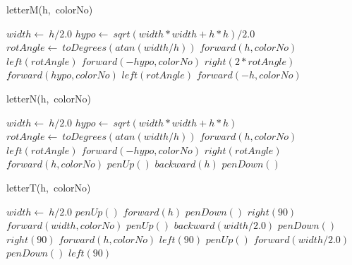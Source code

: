 \documentclass[a4paper,10pt]{article}
\begin{document}
\begin{algorithm}
\caption{letterM(h,\ colorNo)}
\begin{algorithmic}[5]

\STATE {}
\STATE {}
  \STATE \(width\gets\ h/2.0\)
  \STATE \(hypo\gets\ sqrt(width*width+h*h)/2.0\)
  \STATE \(rotAngle\gets\ toDegrees(atan(width/h))\)
  \STATE \(forward(h,colorNo)\)
  \STATE \(left(rotAngle)\)
  \STATE \(forward(-hypo,colorNo)\)
  \STATE \(right(2*rotAngle)\)
  \STATE \(forward(hypo,colorNo)\)
  \STATE \(left(rotAngle)\)
  \STATE \(forward(-h,colorNo)\)

\end{algorithmic}
\end{algorithm}


\begin{algorithm}
\caption{letterN(h,\ colorNo)}
\begin{algorithmic}[5]

\STATE {}
\STATE {}
  \STATE \(width\gets\ h/2.0\)
  \STATE \(hypo\gets\ sqrt(width*width+h*h)\)
  \STATE \(rotAngle\gets\ toDegrees(atan(width/h))\)
  \STATE \(forward(h,colorNo)\)
  \STATE \(left(rotAngle)\)
  \STATE \(forward(-hypo,colorNo)\)
  \STATE \(right(rotAngle)\)
  \STATE \(forward(h,colorNo)\)
  \STATE \(penUp()\)
  \STATE \(backward(h)\)
  \STATE \(penDown()\)

\end{algorithmic}
\end{algorithm}


\begin{algorithm}
\caption{letterT(h,\ colorNo)}
\begin{algorithmic}[5]

\STATE {}
\STATE {}
  \STATE \(width\gets\ h/2.0\)
  \STATE \(penUp()\)
  \STATE \(forward(h)\)
  \STATE \(penDown()\)
  \STATE \(right(90)\)
  \STATE \(forward(width,colorNo)\)
  \STATE \(penUp()\)
  \STATE \(backward(width/2.0)\)
  \STATE \(penDown()\)
  \STATE \(right(90)\)
  \STATE \(forward(h,colorNo)\)
  \STATE \(left(90)\)
  \STATE \(penUp()\)
  \STATE \(forward(width/2.0)\)
  \STATE \(penDown()\)
  \STATE \(left(90)\)

\end{algorithmic}
\end{algorithm}
\end{document}
